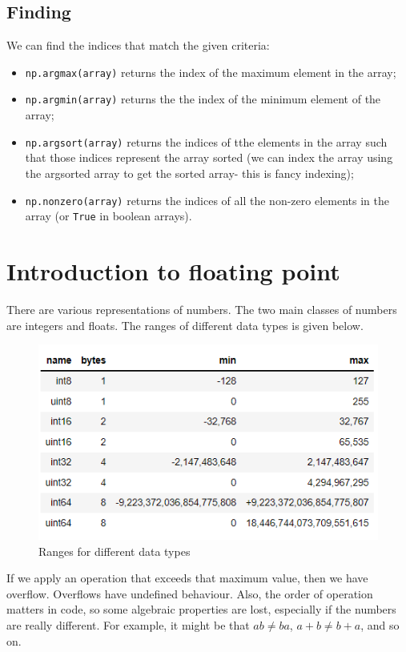 \documentclass[a4paper, openany]{memoir}
\begin{document}
    \subsection{Finding}
    We can find the indices that match the given criteria:
    \begin{itemize}
        \item \texttt{np.argmax(array)} returns the index of the maximum element in the array;
        \item \texttt{np.argmin(array)} returns the the index of the minimum element of the array;
        \item \texttt{np.argsort(array)} returns the indices of tthe elements in the array such that those indices represent the array sorted (we can index the array using the argsorted array to get the sorted array- this is fancy indexing);
        \item \texttt{np.nonzero(array)} returns the indices of all the non-zero elements in the array (or \texttt{True} in boolean arrays).
    \end{itemize}
    \newpage

    \section{Introduction to floating point}
    There are various representations of numbers. The two main classes of numbers are integers and floats. The ranges of different data types is given below.
    \begin{figure}[H]
        \centering
        \includegraphics[scale=0.9]{src/1.1 ranges for different types.PNG}
        \caption{Ranges for different data types}
    \end{figure}
    \noindent If we apply an operation that exceeds that maximum value, then we have overflow. Overflows have undefined behaviour. Also, the order of operation matters in code, so some algebraic properties are lost, especially if the numbers are really different. For example, it might be that $ab \neq ba$, $a + b \neq b + a$, and so on.
    
\end{document}
